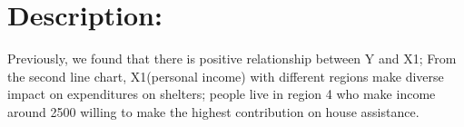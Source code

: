 \documentclass[12pt,letterpaper]{article}
\begin{document}
\section*{Description:}
Previously, we found that there is positive relationship between Y and X1; From the second line chart, X1(personal income) with different regions make diverse impact on expenditures on shelters; people live in region 4 who make income around 2500 willing to make the highest contribution on house assistance.
\end{document}
